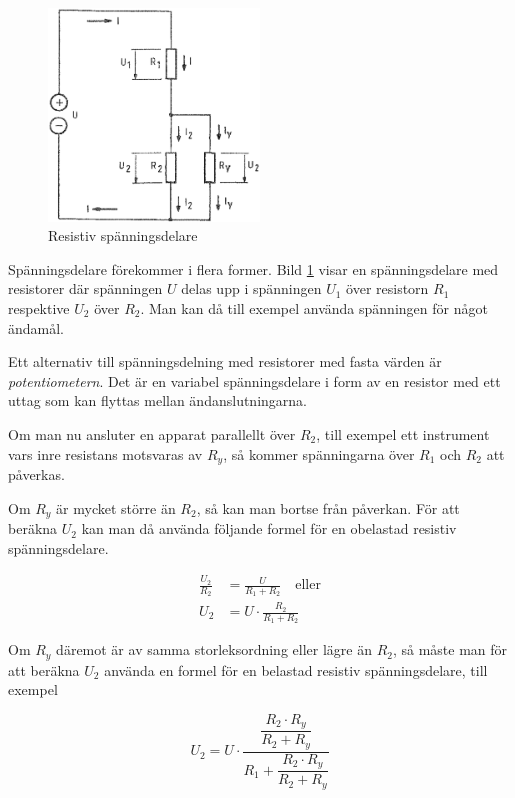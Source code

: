 \begin{figure}
\includegraphics[width=0.5\textwidth]{images/cropped_pdfs/bild_2_3-03.pdf}
\caption{Resistiv spänningsdelare}
\label{fig:BildII3-03}
\end{figure}

Spänningsdelare förekommer i flera former.
Bild \ref{fig:BildII3-03} visar en spänningsdelare med resistorer där
spänningen \(U\) delas upp i spänningen \(U_1\) över resistorn \(R_1\)
respektive \(U_2\) över \(R_2\).
Man kan då till exempel använda spänningen för något ändamål.

Ett alternativ till spänningsdelning med resistorer med fasta värden är
\emph{potentiometern}. Det är en variabel spänningsdelare i form av en resistor
med ett uttag som kan flyttas mellan ändanslutningarna.

Om man nu ansluter en apparat parallellt över \(R_2\), till exempel ett instrument
vars inre resistans motsvaras av \(R_y\), så kommer spänningarna över \(R_1\)
och \(R_2\) att påverkas.

Om \(R_y\) är mycket större än \(R_2\), så kan man bortse från påverkan.
För att beräkna \(U_2\) kan man då använda följande formel för en obelastad
resistiv spänningsdelare.

\begin{align*}
\frac{U_2}{R_2} &= \frac{U}{R_1 + R_2} \quad \text{eller} \\
U_2 &= U \cdot \frac{R_2}{R_1 + R_2}
\end{align*}

Om \(R_y\) däremot är av samma storleksordning eller lägre än \(R_2\), så måste
man för att beräkna \(U_2\) använda en formel för en belastad resistiv
spänningsdelare, till exempel

\[
U_2 = U \cdot \dfrac{ \dfrac{R_2 \cdot R_y}{R_2 + R_y} }{ R_1 + \dfrac{R_2 \cdot R_y}{R_2 + R_y} }
\]

